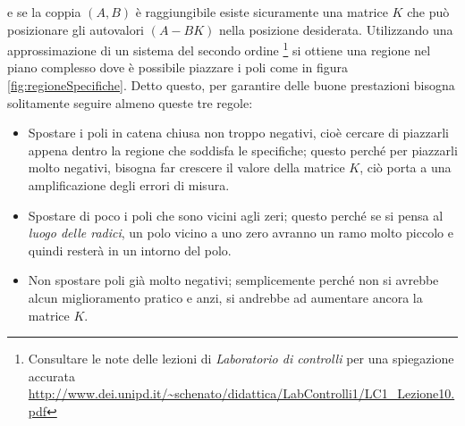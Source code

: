 		\noindent e se la coppia $(A,B)$ è raggiungibile esiste sicuramente una matrice $K$ che può posizionare gli autovalori $(A-BK)$ nella posizione desiderata. Utilizzando una approssimazione di un sistema del secondo ordine \footnote{Consultare le note delle lezioni di \textit{Laboratorio di controlli} per una spiegazione accurata \url{http://www.dei.unipd.it/~schenato/didattica/LabControlli1/LC1_Lezione10.pdf}} si ottiene una regione nel piano complesso dove è possibile piazzare i poli come in figura \ref{fig:regioneSpecifiche}. Detto questo, per garantire delle buone prestazioni bisogna solitamente seguire almeno queste tre regole:
		
		\begin{itemize}
			\item Spostare i poli in catena chiusa non troppo negativi, cioè cercare di piazzarli appena dentro la regione che soddisfa le specifiche; questo perché per piazzarli molto negativi, bisogna far crescere il valore della matrice $K$, ciò porta a una amplificazione degli errori di misura.
			
			\item Spostare di poco i poli che sono vicini agli zeri; questo perché se si pensa al \textit{luogo delle radici}, un polo vicino a uno zero avranno un ramo molto piccolo e quindi resterà in un intorno del polo.
			
			\item  Non spostare poli già molto negativi; semplicemente perché non si avrebbe alcun miglioramento pratico e anzi, si andrebbe ad aumentare ancora la matrice $K$.

		\end{itemize}
		

